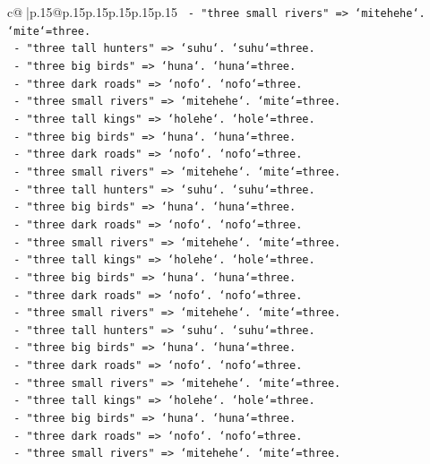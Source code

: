 \documentclass{article}
\begin{document}
{\begin{supertabular}{c@{$\;$}|p{.15\linewidth}@{}p{.15\linewidth}p{.15\linewidth}p{.15\linewidth}p{.15\linewidth}p{.15\linewidth}}
{{{\texttt{      {-} "three small rivers" => `mitehehe`. `mite`=three.} \\
\texttt{      {-} "three tall hunters" => `suhu`. `suhu`=three.} \\
\texttt{      {-} "three big birds" => `huna`. `huna`=three.} \\
\texttt{      {-} "three dark roads" => `nofo`. `nofo`=three.} \\
\texttt{      {-} "three small rivers" => `mitehehe`. `mite`=three.} \\
\texttt{      {-} "three tall kings" => `holehe`. `hole`=three.} \\
\texttt{      {-} "three big birds" => `huna`. `huna`=three.} \\
\texttt{      {-} "three dark roads" => `nofo`. `nofo`=three.} \\
\texttt{      {-} "three small rivers" => `mitehehe`. `mite`=three.} \\
\texttt{      {-} "three tall hunters" => `suhu`. `suhu`=three.} \\
\texttt{      {-} "three big birds" => `huna`. `huna`=three.} \\
\texttt{      {-} "three dark roads" => `nofo`. `nofo`=three.} \\
\texttt{      {-} "three small rivers" => `mitehehe`. `mite`=three.} \\
\texttt{      {-} "three tall kings" => `holehe`. `hole`=three.} \\
\texttt{      {-} "three big birds" => `huna`. `huna`=three.} \\
\texttt{      {-} "three dark roads" => `nofo`. `nofo`=three.} \\
\texttt{      {-} "three small rivers" => `mitehehe`. `mite`=three.} \\
\texttt{      {-} "three tall hunters" => `suhu`. `suhu`=three.} \\
\texttt{      {-} "three big birds" => `huna`. `huna`=three.} \\
\texttt{      {-} "three dark roads" => `nofo`. `nofo`=three.} \\
\texttt{      {-} "three small rivers" => `mitehehe`. `mite`=three.} \\
\texttt{      {-} "three tall kings" => `holehe`. `hole`=three.} \\
\texttt{      {-} "three big birds" => `huna`. `huna`=three.} \\
\texttt{      {-} "three dark roads" => `nofo`. `nofo`=three.} \\
\texttt{      {-} "three small rivers" => `mitehehe`. `mite`=three.} \\
}}}
\end{supertabular}}
\end{document}

